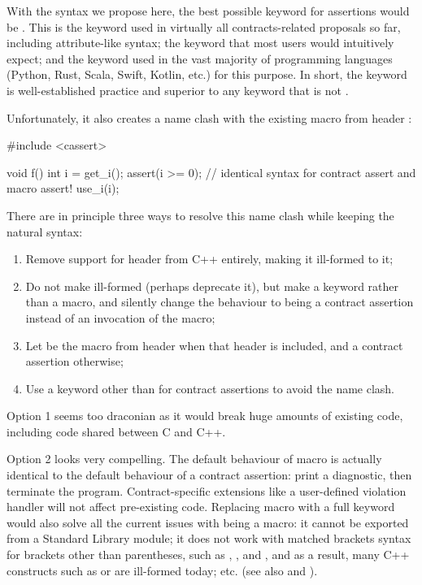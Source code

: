 With the syntax we propose here, the best possible keyword for assertions would be . This is the keyword used in virtually all contracts-related proposals so far, including attribute-like syntax; the keyword that most users would intuitively expect; and the keyword used in the vast majority of programming languages (Python, Rust, Scala, Swift, Kotlin, etc.) for this purpose. In short, the keyword  is well-established practice and superior to any keyword that is not .

Unfortunately, it also creates a name clash with the existing  macro from header :

\begin{codeblock}
#include <cassert> 

void f() {
  int i = get_i();
  assert(i >= 0);  // identical syntax for contract assert and macro assert!
  use_i(i);
}
\end{codeblock}

There are in principle three ways to resolve this name clash while keeping the natural syntax:
\begin{enumerate}
\item Remove support for header  from C++ entirely, making it ill-formed to  it;
\item Do not make  ill-formed (perhaps deprecate it), but make  a keyword rather than a macro, and silently change the behaviour to being a contract assertion instead of an invocation of the macro;
\item Let  be the macro from header  when that header is included, and a contract assertion otherwise;
\item Use a keyword other than  for contract assertions to avoid the name clash.
\end{enumerate}
Option 1 seems too draconian as it would break huge amounts of existing code, including code shared between C and C++.

Option 2 looks very compelling. The default behaviour of macro  is actually identical to the default behaviour of a contract assertion: print a diagnostic, then terminate the program. Contract-specific extensions like a user-defined violation handler will not affect pre-existing code. Replacing macro  with a full keyword would also solve all the current issues with  being a macro: it cannot be exported from a Standard Library module; it does not work with matched brackets syntax for brackets other than parentheses, such as , , and \tcode{[...]}, and as a result, many C++ constructs such as  or  are ill-formed today; etc. (see also \cite{P2264R5} and \cite{P2884R0}).

